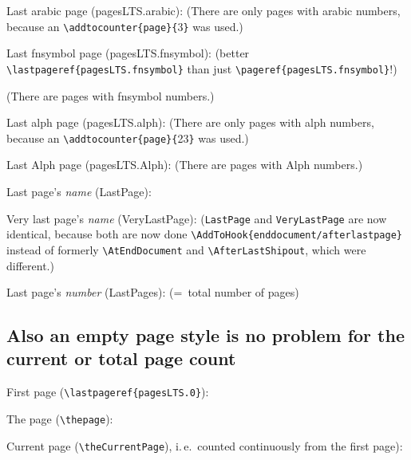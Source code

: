 \documentclass[british]{article}[2024/06/29]%
\def\pagesLTSexampleArabic{3}
\def\pagesLTSexamplealph{23}
\begin{document}
Last arabic page (pagesLTS.arabic): 
(There are only  pages with arabic numbers,
because an \verb|\addtocounter{page}{|\pagesLTSexampleArabic\verb|}| was used.)\bigskip

Last fnsymbol page (pagesLTS.fnsymbol): \newline
(better \verb|\lastpageref{pagesLTS.fnsymbol}| than just\newline
\verb|\pageref{pagesLTS.fnsymbol}|!)\bigskip

(There are  pages with fnsymbol numbers.)\bigskip

Last alph page (pagesLTS.alph): 
(There are only  pages with alph numbers,
because an \verb|\addtocounter{page}{|\pagesLTSexamplealph\verb|}| was used.)\bigskip

Last Alph page (pagesLTS.Alph): 
(There are  pages with Alph numbers.)\bigskip

Last page's \textit{name} (LastPage): \bigskip

Very last page's \textit{name} (VeryLastPage): \newline
(\texttt{LastPage} and \texttt{VeryLastPage} are now identical, because both are now done
\verb|\AddToHook{enddocument/afterlastpage}| instead of formerly\newline
\verb|\AtEndDocument| and \verb|\AfterLastShipout|, which were different.)\bigskip

Last page's \textit{number} (LastPages): 
(=~total number of pages)

\newpage
\thispagestyle{empty}
\subsection[Empty page style]{Also an empty page style is no problem %
for the current or total page count}

\bigskip

First page (\verb|\lastpageref{pagesLTS.0}|):
\bigskip

The page (\verb|\thepage|): \thepage \bigskip

Current page (\verb|\theCurrentPage|),
i.\,e.~counted continuously from the first page): \theCurrentPage \bigskip
\end{document}
